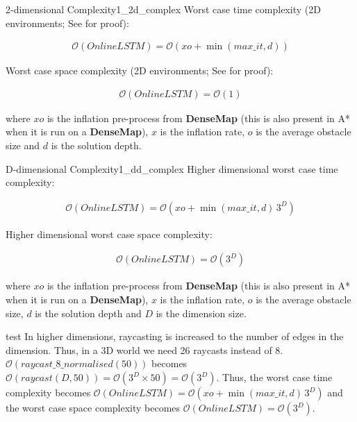 \begin{Theo}{2-dimensional Complexity}{1_2d_complex}
Worst case time complexity (2D environments; See  for proof):

\begin{align*}
    \mathcal{O}(OnlineLSTM) = \mathcal{O}(xo + \min(max\_it, d))
\end{align*}

Worst case space complexity (2D environments; See  for proof):

\begin{align*}
    \mathcal{O}(OnlineLSTM) = \mathcal{O}(1)
\end{align*}

where $xo$ is the inflation pre-process from \textbf{DenseMap} (this is also present in A* when it is run on a \textbf{DenseMap}), $x$ is the inflation rate, $o$ is the average obstacle size and $d$ is the solution depth. 

\end{Theo}


\begin{Theo}{D-dimensional Complexity}{1_dd_complex}
Higher dimensional worst case time complexity:

\begin{align*}
    \mathcal{O}(OnlineLSTM) = \mathcal{O}(xo + \min(max\_it, d)\,3^D)
\end{align*}

Higher dimensional worst case space complexity:

\begin{align*}
    \mathcal{O}(OnlineLSTM) = \mathcal{O}(3^D)
\end{align*}

where $xo$ is the inflation pre-process from \textbf{DenseMap} (this is also present in A* when it is run on a \textbf{DenseMap}), $x$ is the inflation rate, $o$ is the average obstacle size, $d$ is the solution depth and $D$ is the dimension size. 

\begin{Proof}{}{test}
In higher dimensions, raycasting is increased to the number of edges in the dimension. Thus, in a 3D world we need 26 raycasts instead of 8. $\mathcal{O}(raycast\_8\_normalised(50))$ becomes $\mathcal{O}(raycast(D, 50)) = \mathcal{O}(3^D \times 50) = \mathcal{O}(3^D)$. Thus, the worst case time complexity becomes $\mathcal{O}(OnlineLSTM) = \mathcal{O}(xo + \min(max\_it, d)\,3^D)$ and the worst case space complexity becomes $\mathcal{O}(OnlineLSTM) = \mathcal{O}(3^D)$.
\end{Proof}

\end{Theo}


